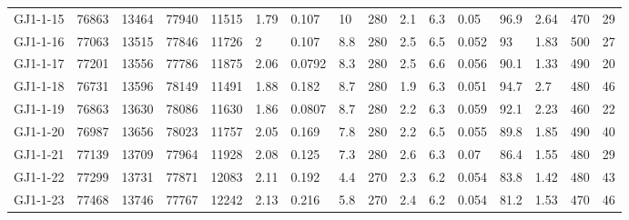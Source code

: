 \begin{longtable*}{@{}l@{~~}l@{~~}l@{~~}l@{~~}l@{~~}l@{~~}l@{~~}l@{~~}l@{~~}l@{~~}l@{~~}l@{~~}l@{~~}l@{~~}l@{~~}l@{}}
GJ1-1-15&76863&13464&77940&11515&1.79&0.107&10&280&2.1&6.3&0.05&96.9&2.64&470&29\\
GJ1-1-16&77063&13515&77846&11726&2&0.107&8.8&280&2.5&6.5&0.052&93&1.83&500&27\\
GJ1-1-17&77201&13556&77786&11875&2.06&0.0792&8.3&280&2.5&6.6&0.056&90.1&1.33&490&20\\
GJ1-1-18&76731&13596&78149&11491&1.88&0.182&8.7&280&1.9&6.3&0.051&94.7&2.7&480&46\\
GJ1-1-19&76863&13630&78086&11630&1.86&0.0807&8.7&280&2.2&6.3&0.059&92.1&2.23&460&22\\
GJ1-1-20&76987&13656&78023&11757&2.05&0.169&7.8&280&2.2&6.5&0.055&89.8&1.85&490&40\\
GJ1-1-21&77139&13709&77964&11928&2.08&0.125&7.3&280&2.6&6.3&0.07&86.4&1.55&480&29\\
GJ1-1-22&77299&13731&77871&12083&2.11&0.192&4.4&270&2.3&6.2&0.054&83.8&1.42&480&43\\
GJ1-1-23&77468&13746&77767&12242&2.13&0.216&5.8&270&2.4&6.2&0.054&81.2&1.53&470&46\\
\end{longtable*}
\addtolength\tabcolsep{+0.05em}
